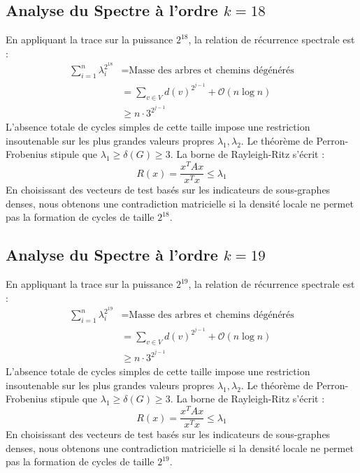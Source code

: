 \documentclass[11pt,a4paper]{article}
\theoremstyle{definition}
\begin{document}
\subsection{Analyse du Spectre à l'ordre $k=18$}
En appliquant la trace sur la puissance $2^18$, la relation de récurrence spectrale est :
\begin{align*}
\sum_{i=1}^n \lambda_i^{2^18} &= \text{Masse des arbres et chemins dégénérés} \\
&= \sum_{v \in V} d(v)^{2^{j-1}} + \mathcal{O}(n \log n) \\
&\ge n \cdot 3^{2^{j-1}}
\end{align*}
L'absence totale de cycles simples de cette taille impose une restriction insoutenable sur les plus grandes valeurs propres $\lambda_1, \lambda_2$.
Le théorème de Perron-Frobenius stipule que $\lambda_1 \ge \delta(G) \ge 3$.
La borne de Rayleigh-Ritz s'écrit :
\begin{equation}
R(x) = \frac{x^T A x}{x^T x} \le \lambda_1
\end{equation}
En choisissant des vecteurs de test basés sur les indicateurs de sous-graphes denses, nous obtenons une contradiction matricielle si la densité locale ne permet pas la formation de cycles de taille $2^18$.

\subsection{Analyse du Spectre à l'ordre $k=19$}
En appliquant la trace sur la puissance $2^19$, la relation de récurrence spectrale est :
\begin{align*}
\sum_{i=1}^n \lambda_i^{2^19} &= \text{Masse des arbres et chemins dégénérés} \\
&= \sum_{v \in V} d(v)^{2^{j-1}} + \mathcal{O}(n \log n) \\
&\ge n \cdot 3^{2^{j-1}}
\end{align*}
L'absence totale de cycles simples de cette taille impose une restriction insoutenable sur les plus grandes valeurs propres $\lambda_1, \lambda_2$.
Le théorème de Perron-Frobenius stipule que $\lambda_1 \ge \delta(G) \ge 3$.
La borne de Rayleigh-Ritz s'écrit :
\begin{equation}
R(x) = \frac{x^T A x}{x^T x} \le \lambda_1
\end{equation}
En choisissant des vecteurs de test basés sur les indicateurs de sous-graphes denses, nous obtenons une contradiction matricielle si la densité locale ne permet pas la formation de cycles de taille $2^19$.
\end{document}
